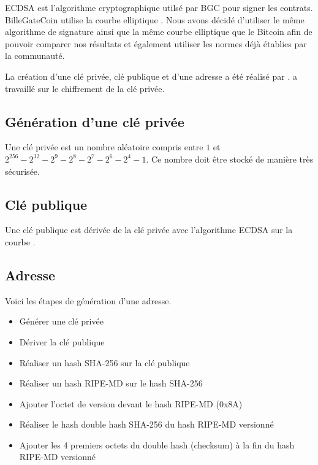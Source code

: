 \documentclass{article}
\begin{document}
ECDSA est l'algorithme cryptographique utilsé par BGC pour signer les contrats.
BilleGateCoin utilise la courbe elliptique . Nous avons décidé d'utiliser le même algorithme de signature ainsi que la même courbe elliptique que le Bitcoin afin de pouvoir comparer nos résultats et également utiliser les normes déjà établies par la communauté.

La création d'une clé privée, clé publique et d'une adresse a été réalisé par .
 a travaillé sur le chiffrement de la clé privée.

\subsection{Génération d'une clé privée}

Une clé privée est un nombre aléatoire compris entre $1$ et $2^{256} - 2^{32} - 2^{9} - 2^{8} - 2^{7} - 2^{6} - 2^{4} - 1$. Ce nombre doit être stocké de manière très sécurisée.

\subsection{Clé publique}
Une clé publique est dérivée de la clé privée avec l'algorithme ECDSA sur la courbe .

\subsection{Adresse}
Voici les étapes de génération d'une adresse.

\begin{itemize}
    \item Générer une clé privée
    \item Dériver la clé publique
    \item Réaliser un hash SHA-256 sur la clé publique
    \item Réaliser un hash RIPE-MD sur le hash SHA-256
    \item Ajouter l'octet de version devant le hash RIPE-MD (0x8A)
    \item Réaliser le hash double hash SHA-256 du hash RIPE-MD versionné
    \item Ajouter les 4 premiers octets du double hash (checksum) à la fin du hash RIPE-MD versionné
\end{itemize}
\end{document}
